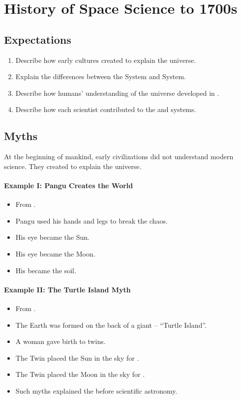 \documentclass[12pt]{article}
\newcommand{\fillin}[1]{\uline{\hspace{#1}}}
\begin{document}
\section*{History of Space Science to 1700s}

\subsection*{Expectations}
\begin{enumerate}
  \item Describe how early cultures created \fillin{3cm} to explain the universe.
  \item Explain the differences between the \fillin{3cm} System and \fillin{3cm} System.
  \item Describe how humans' understanding of the universe developed in \fillin{4cm}.
  \item Describe how each scientist contributed to the \fillin{3cm} and \fillin{3cm} systems.
\end{enumerate}

\subsection*{Myths}
At the beginning of mankind, early civilizations did not understand modern science. 
They created \fillin{3cm} to explain the universe.

\paragraph{Example I: Pangu Creates the World}
\begin{itemize}
  \item From \fillin{3cm}.
  \item Pangu used his hands and legs to break the chaos.
  \item His \fillin{2cm} eye became the Sun.
  \item His \fillin{2cm} eye became the Moon.
  \item His \fillin{2cm} became the soil.
\end{itemize}

\paragraph{Example II: The Turtle Island Myth}
\begin{itemize}
  \item From \fillin{4cm}.
  \item The Earth was formed on the back of a giant \fillin{2.5cm} -- ``Turtle Island''.
  \item A woman gave birth to twins.
  \item The \fillin{2cm} Twin placed the Sun in the sky for \fillin{3cm}.
  \item The \fillin{2cm} Twin placed the Moon in the sky for \fillin{3cm}.
  \item Such myths explained the \fillin{3cm} before scientific astronomy.
\end{itemize}
\end{document}
